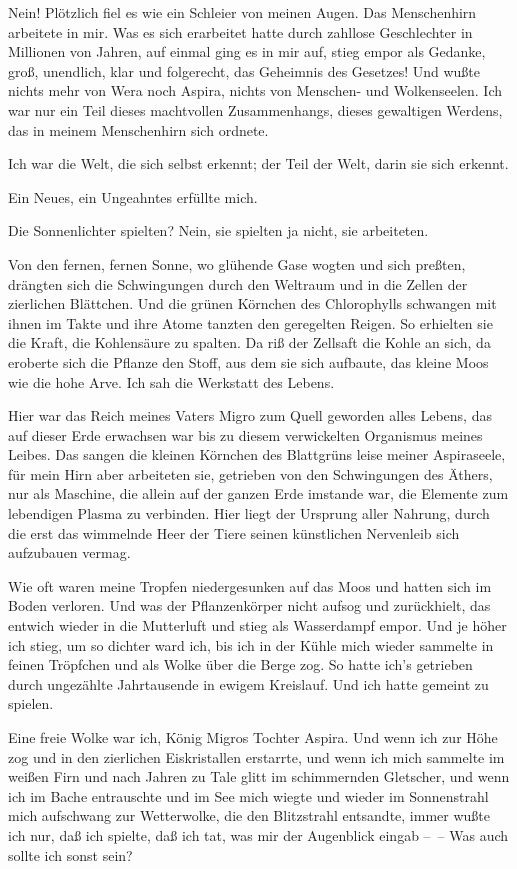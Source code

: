 Nein! Plötzlich fiel es wie ein Schleier von meinen Augen. Das
Menschenhirn arbeitete in mir. Was es sich erarbeitet hatte durch
zahllose Geschlechter in Millionen von Jahren, auf einmal ging es
in mir auf, stieg empor als Gedanke, groß, unendlich, klar und
folgerecht, das Geheimnis des Gesetzes! Und wußte nichts mehr von
Wera noch Aspira, nichts von Menschen- und Wolkenseelen. Ich war
nur ein Teil dieses machtvollen Zusammenhangs, dieses gewaltigen
Werdens, das in meinem Menschenhirn sich ordnete.

Ich war die Welt, die sich selbst erkennt; der Teil der Welt, darin
sie sich erkennt.

Ein Neues, ein Ungeahntes erfüllte mich.

Die Sonnenlichter spielten? Nein, sie spielten ja nicht, sie
arbeiteten.

Von den fernen, fernen Sonne, wo glühende Gase wogten und sich
preßten, drängten sich die Schwingungen durch den Weltraum und in
die Zellen der zierlichen Blättchen. Und die grünen Körnchen des
Chlorophylls schwangen mit ihnen im Takte und ihre Atome tanzten
den geregelten Reigen. So erhielten sie die Kraft, die Kohlensäure
zu spalten. Da riß der Zellsaft die Kohle an sich, da eroberte sich
die Pflanze den Stoff, aus dem sie sich aufbaute, das kleine Moos
wie die hohe Arve. Ich sah die Werkstatt des Lebens.

Hier war das Reich meines Vaters Migro zum Quell geworden alles
Lebens, das auf dieser Erde erwachsen war bis zu diesem
verwickelten Organismus meines Leibes. Das sangen die kleinen
Körnchen des Blattgrüns leise meiner Aspiraseele, für mein Hirn
aber arbeiteten sie, getrieben von den Schwingungen des Äthers, nur
als Maschine, die allein auf der ganzen Erde imstande war, die
Elemente zum lebendigen Plasma zu verbinden. Hier liegt der
Ursprung aller Nahrung, durch die erst das wimmelnde Heer der Tiere
seinen künstlichen Nervenleib sich aufzubauen vermag.

Wie oft waren meine Tropfen niedergesunken auf das Moos und hatten
sich im Boden verloren. Und was der Pflanzenkörper nicht aufsog und
zurückhielt, das entwich wieder in die Mutterluft und stieg als
Wasserdampf empor. Und je höher ich stieg, um so dichter ward ich,
bis ich in der Kühle mich wieder sammelte in feinen Tröpfchen und
als Wolke über die Berge zog. So hatte ich's getrieben durch
ungezählte Jahrtausende in ewigem Kreislauf. Und ich hatte gemeint
zu spielen.

Eine freie Wolke war ich, König Migros Tochter Aspira. Und wenn ich
zur Höhe zog und in den zierlichen Eiskristallen erstarrte, und
wenn ich mich sammelte im weißen Firn und nach Jahren zu Tale glitt
im schimmernden Gletscher, und wenn ich im Bache entrauschte und im
See mich wiegte und wieder im Sonnenstrahl mich aufschwang zur
Wetterwolke, die den Blitzstrahl entsandte, immer wußte ich nur,
daß ich spielte, daß ich tat, was mir der Augenblick eingab –~– Was
auch sollte ich sonst sein?

